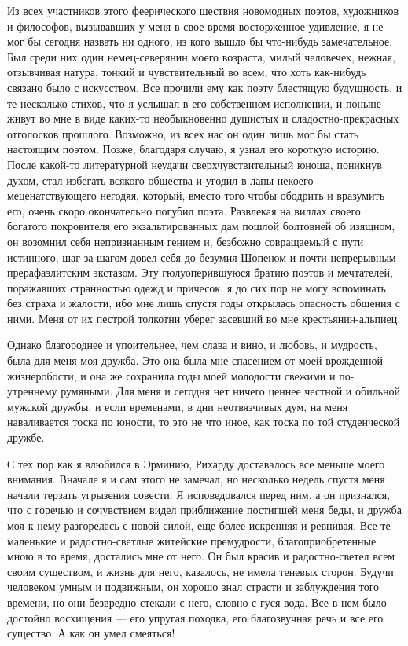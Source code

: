 Из  всех  участников  этого феерического  шествия  новомодных  поэтов,
художников и  философов, вызывавших у  меня в свое  время восторженное
удивление,  я не  мог  бы сегодня  назвать ни  одного,  из кого  вышло
бы  что-нибудь  замечательное.  Был  среди  них  один  немец-северянин
моего возраста,  милый человечек, нежная, отзывчивая  натура, тонкий и
чувствительный во всем, что хоть как-нибудь связано было с искусством.
Все прочили ему как поэту блестящую будущность, и те несколько стихов,
что я  услышал в его собственном  исполнении, и поныне живут  во мне в
виде каких-то необыкновенно душистых и сладостно-прекрасных отголосков
прошлого. Возможно,  из всех нас он  один лишь мог бы  стать настоящим
поэтом. Позже, благодаря  случаю, я узнал его  короткую историю. После
какой-то  литературной  неудачи  сверхчувствительный  юноша,  поникнув
духом,  стал  избегать  всякого  общества  и  угодил  в  лапы  некоего
меценатствующего  негодяя,  который,  вместо  того  чтобы  ободрить  и
вразумить его,  очень скоро  окончательно погубил поэта.  Развлекая на
виллах  своего богатого  покровителя его  экзальтированных дам  пошлой
болтовней  об  изящном,  он   возомнил  себя  непризнанным  гением  и,
безбожно  совращаемый с  пути истинного,  шаг за  шагом довел  себя до
безумия  Шопеном и  почти  непрерывным  прерафаэлитским экстазом.  Эту
гюлуоперившуюся  братию поэтов  и  мечтателей, поражавших  странностью
одежд  и причесок,  я  до сих  пор  не могу  вспоминать  без страха  и
жалости, ибо мне лишь спустя  годы открылась опасность общения с ними.
Меня от их пестрой толкотни уберег засевший во мне крестьянин-альпиец.

Однако  благороднее и  упоительнее,  чем  слава и  вино,  и любовь,  и
мудрость, была для меня моя дружба. Это она была мне спасением от моей
врожденной  жизнеробости,  и  она  же сохранила  годы  моей  молодости
свежими  и  по-утреннему  румяными.  Для меня  и  сегодня  нет  ничего
ценнее  честной и  обильной мужской  дружбы, и  если временами,  в дни
неотвязчивых дум, на меня наваливается тоска  по юности, то это не что
иное, как тоска по той студенческой дружбе.

С тех  пор как я  влюбился в  Эрминию, Рихарду доставалось  все меньше
моего внимания. Вначале я и сам  этого не замечал, но несколько недель
спустя меня  начали терзать  угрызения совести. Я  исповедовался перед
ним, а  он признался,  что с горечью  и сочувствием  видел приближение
постигшей меня  беды, и дружба моя  к нему разгорелась с  новой силой,
еще более  искренняя и ревнивая.  Все те маленькие  и радостно-светлые
житейские премудрости,  благоприобретенные мною в то  время, достались
мне от него.  Он был красив и радостно-светел всем  своим существом, и
жизнь для  него, казалось, не  имела теневых сторон.  Будучи человеком
умным и подвижным, он хорошо  знал страсти и заблуждения того времени,
но они безвредно  стекали с него, словно  с гуся вода. Все  в нем было
достойно восхищения ---  его упругая походка, его  благозвучная речь и
все его существо. А как он умел смеяться!

